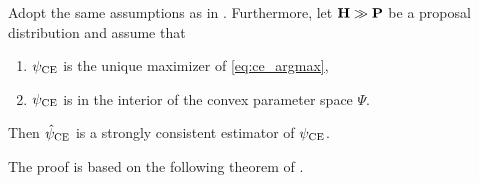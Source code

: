 \begin{theorem}
    \label{thm:cem-consistent}
    Adopt the same assumptions as in . Furthermore, let $\mathbf H \gg \mathbf P$ be a proposal distribution and assume that
    
    \begin{enumerate}
        \item ${\psi_{\text{CE}}}$ is the unique maximizer of \eqref{eq:ce_argmax},
        \item ${\psi_{\text{CE}}}$ is in the interior of the convex parameter space $\Psi$.
    \end{enumerate}
    
   Then ${\hat\psi_{\text{CE}}}$ is a strongly consistent estimator of ${\psi_{\text{CE}}}$.
\end{theorem}

The proof is based on the following theorem of \citeauthor{Haberman1989Concavity}.

